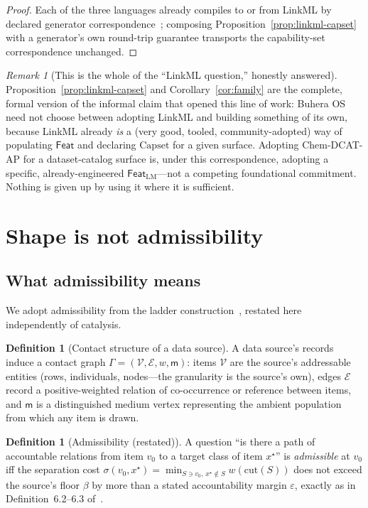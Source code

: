 \documentclass[11pt,a4paper,twocolumn]{article}
\theoremstyle{definition}
\newtheorem{definition}[theorem]{Definition}
\theoremstyle{remark}
\newtheorem{remark}[theorem]{Remark}
\newcommand{\Feat}{\mathsf{Feat}}
\newcommand{\Capset}{\mathrm{Capset}}
\newcommand{\Med}{\mathsf{m}}
\newcommand{\Gph}{\Gamma}
\newcommand{\V}{\mathcal{V}}
\newcommand{\E}{\mathcal{E}}
\newcommand{\wt}{w}
\newcommand{\sepc}{\sigma}
\newcommand{\flo}{\beta}
\newcommand{\LM}{\mathrm{LM}}
\begin{document}
\begin{proof}
Each of the three languages already compiles to or from LinkML by declared
generator correspondence~\cite{linkml}; composing Proposition~\ref{prop:linkml-capset}
with a generator's own round-trip guarantee transports the capability-set
correspondence unchanged.
\end{proof}

\begin{remark}[This is the whole of the ``LinkML question,'' honestly answered]
Proposition~\ref{prop:linkml-capset} and Corollary~\ref{cor:family} are the
complete, formal version of the informal claim that opened this line of work:
Buhera OS need not choose between adopting LinkML and building something of its
own, because LinkML already \emph{is} a (very good, tooled, community-adopted)
way of populating $\Feat$ and declaring $\Capset$ for a given surface. Adopting
Chem-DCAT-AP for a dataset-catalog surface is, under this correspondence,
adopting a specific, already-engineered $\Feat_\LM$---not a competing
foundational commitment. Nothing is given up by using it where it is sufficient.
\end{remark}

\section{Shape is not admissibility}
\label{sec:separation}

\subsection{What admissibility means}

We adopt admissibility from the ladder construction~\cite{ladder}, restated here
independently of catalysis.

\begin{definition}[Contact structure of a data source]
\label{def:contact-of-source}
A data source's records induce a contact graph $\Gph=(\V,\E,\wt,\Med)$: items
$\V$ are the source's addressable entities (rows, individuals, nodes---the
granularity is the source's own), edges $\E$ record a positive-weighted relation
of co-occurrence or reference between items, and $\Med$ is a distinguished medium
vertex representing the ambient population from which any item is drawn.
\end{definition}

\begin{definition}[Admissibility (restated)]
\label{def:admissibility}
A question ``is there a path of accountable relations from item $v_0$ to a
target class of item $x^\star$'' is \emph{admissible} at $v_0$ iff the separation
cost $\sepc(v_0,x^\star)=\min_{S\ni v_0,\,x^\star\notin S}\wt(\mathrm{cut}(S))$
does not exceed the source's floor $\flo$ by more than a stated accountability
margin $\varepsilon$, exactly as in Definition~6.2--6.3
of~\cite{ladder}.
\end{definition}
\end{document}
